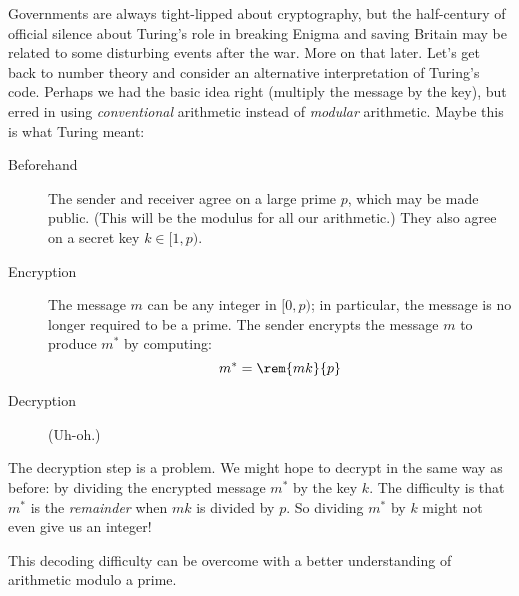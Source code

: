 Governments are always tight-lipped about cryptography, but the
half-century of official silence about Turing's role in breaking
Enigma and saving Britain may be related to some disturbing events
after the war.  More on that later.  Let's get back to number theory
and consider an alternative interpretation of Turing's code.  Perhaps
we had the basic idea right (multiply the message by the key), but
erred in using \emph{conventional} arithmetic instead of
\emph{modular} arithmetic.  Maybe this is what Turing meant:
%
\begin{description}

\item[Beforehand] The sender and receiver agree on a large prime $p$,
which may be made public.  (This will be the modulus for all our
arithmetic.)  They also agree on a secret key $k \in [1, p)$.

\item[Encryption] The message $m$ can be any integer in 
$[0, p)$; in particular, the message is no longer
required to be a prime.  The sender encrypts the message $m$ to
produce $m^*$ by computing:
%
\begin{equation}
m^* = \rem{mk}{p} \label{eq:turing-code}
\end{equation}

\item[Decryption] (Uh-oh.)

\end{description}

The decryption step is a problem.  We might hope to decrypt in the
same way as before: by dividing the encrypted message $m^*$ by the key
$k$.  The difficulty is that $m^*$ is the \emph{remainder} when $mk$
is divided by $p$.  So dividing $m^*$ by $k$ might not even give us an
integer!

This decoding difficulty can be overcome with a better understanding
of arithmetic modulo a prime.

\begin{problems}

\practiceproblems
{}

  \homeworkproblems

  \classproblems
\end{problems}

